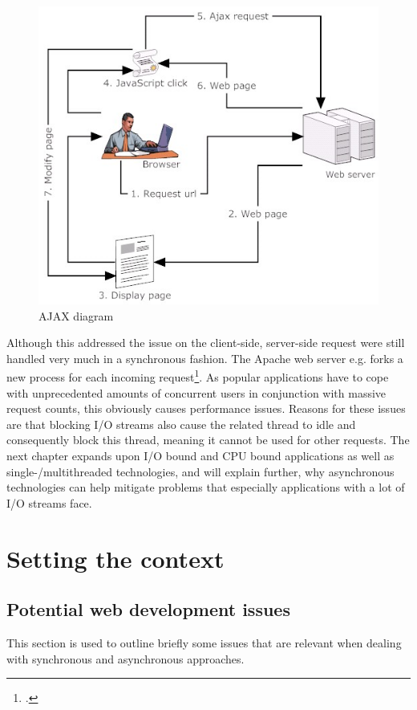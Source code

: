 \begin{figure}[hbtp]
\centering
\includegraphics[scale=0.5]{img/ajax-diagram}
\caption[AJAX diagram]{AJAX diagram\label{img_ajax}}
\end{figure}

Although this addressed the issue on the client-side, server-side request were
still handled very much in a synchronous fashion. The Apache web server e.g.
forks a new process for each incoming request\footcite[Cf.][]{apache_2013}.
As popular applications have to cope with unprecedented amounts of concurrent
users in conjunction with massive request counts, this obviously causes
performance issues. Reasons for these issues are that blocking I/O streams also
cause the related thread to idle and consequently block this thread, meaning it
cannot be used for other requests. The next chapter expands upon I/O bound and
CPU bound applications as well as single-/multithreaded technologies, and will
explain further, why asynchronous technologies can help mitigate problems that
especially applications with a lot of I/O streams face.\\

\newpage
\section{Setting the context}
\label{setting_the_context}

\subsection{Potential web development issues}
\label{potentialissues}
This section is used to outline briefly some issues that are relevant when dealing with synchronous and asynchronous approaches.

